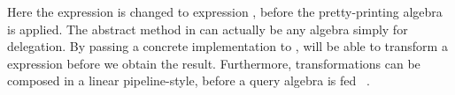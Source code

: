 Here the  expression  is changed to  expression , before the pretty-printing algebra is applied. The abstract method
 in  can actually be any algebra simply for delegation. By passing a concrete implementation
to ,  will be able to transform a  expression before we obtain the result. Furthermore, transformations can be composed in a linear pipeline-style, before a query algebra is fed ~\cite{Zhang2015}.
